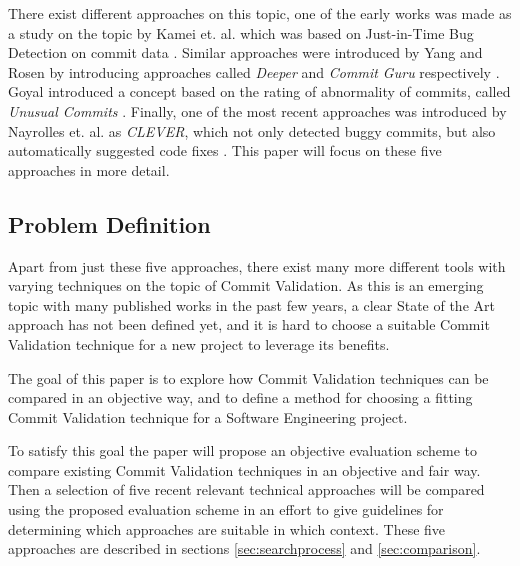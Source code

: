 There exist different approaches on this topic, one of the early works was made as a study on the topic by Kamei et. al. which was based on Just-in-Time Bug Detection on commit data \cite{Kamei2013}. Similar approaches were introduced by Yang and Rosen by introducing approaches called \textit{Deeper} and \textit{Commit Guru} respectively \cite{Yang2015,Rosen2015}. Goyal introduced a concept based on the rating of abnormality of commits, called \textit{Unusual Commits} \cite{Goyal2017}. Finally, one of the most recent approaches was introduced by Nayrolles et. al. as \textit{CLEVER}, which not only detected buggy commits, but also automatically suggested code fixes \cite{Nayrolles2018}. This paper will focus on these five approaches in more detail.

\subsection{Problem Definition}

Apart from just these five approaches, there exist many more different tools with varying techniques on the topic of Commit Validation.
As this is an emerging topic with many published works in the past few years, a clear State of the Art approach has not been defined yet, and it is hard to choose a suitable Commit Validation technique for a new project to leverage its benefits. 

The goal of this paper is to explore how Commit Validation techniques can be compared in an objective way, and to define a method for choosing a fitting Commit Validation technique for a Software Engineering project.

To satisfy this goal the paper will propose an objective evaluation scheme to compare existing Commit Validation techniques in an objective and fair way. Then a selection of five recent relevant technical approaches will be compared using the proposed evaluation scheme in an effort to give guidelines for determining which approaches are suitable in which context. These five approaches are described in sections \ref{sec:searchprocess} and \ref{sec:comparison}.

